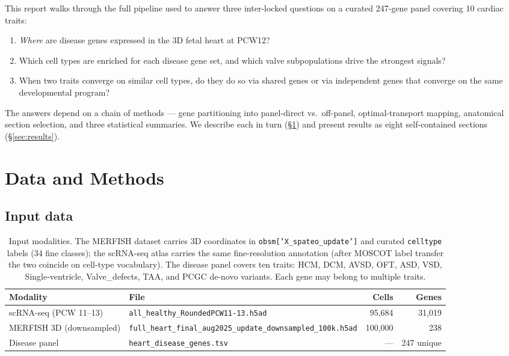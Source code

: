 \documentclass[11pt,a4paper]{article}
\begin{document}
This report walks through the full pipeline used to answer three
inter-locked questions on a curated 247-gene panel covering 10 cardiac
traits:
\begin{enumerate}[leftmargin=*,itemsep=0pt]
    \item \emph{Where} are disease genes expressed in the 3D fetal heart at PCW12?
    \item Which cell types are enriched for each disease gene set, and
          which valve subpopulations drive the strongest signals?
    \item When two traits converge on similar cell types, do they do so
          via shared genes or via independent genes that converge on the
          same developmental program?
\end{enumerate}

The answers depend on a chain of methods --- gene partitioning into
panel-direct vs.\ off-panel, optimal-transport mapping, anatomical
section selection, and three statistical summaries. We describe each in
turn (\S\ref{sec:methods}) and present results as eight self-contained
sections (\S\ref{sec:results}).

\section{Data and Methods}
\label{sec:methods}

\subsection{Input data}

\begin{table}[H]
    \centering\small
    \begin{tabularx}{\linewidth}{@{}l Y r r@{}}
        \toprule
        \textbf{Modality} & \textbf{File} & \textbf{Cells} & \textbf{Genes} \\
        \midrule
        scRNA-seq (PCW 11--13) & \texttt{all\_healthy\_RoundedPCW11-13.h5ad} & 95{,}684 & 31{,}019 \\
        MERFISH 3D (downsampled) & {\scriptsize\texttt{full\_heart\_final\_aug2025\_update\_\allowbreak downsampled\_100k.h5ad}} & 100{,}000 & 238 \\
        Disease panel & \texttt{heart\_disease\_genes.tsv} & --- & 247 unique \\
        \bottomrule
    \end{tabularx}
    \caption{Input modalities. The MERFISH dataset carries 3D
    coordinates in \texttt{obsm['X\_spateo\_update']} and curated
    \texttt{celltype} labels (34 fine classes); the scRNA-seq atlas
    carries the same fine-resolution annotation (after MOSCOT label
    transfer the two coincide on cell-type vocabulary). The disease
    panel covers ten traits: HCM, DCM, AVSD, OFT, ASD, VSD,
    Single-ventricle, Valve\_defects, TAA, and PCGC de-novo variants.
    Each gene may belong to multiple traits.}
\end{table}
\end{document}
